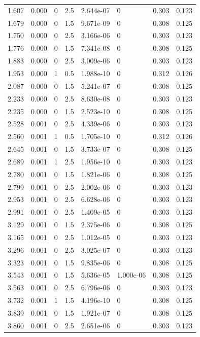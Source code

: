 \documentclass[preview]{standalone}
\begin{document}
{{\begin{tabular}{L{1.2cm}C{1.2cm} C{0.3cm}C{0.5cm} C{1.4cm}C{1.4cm} C{1.4cm}C{1.4cm}}
  1.607  &  0.000  & 0     & 2.5 &  2.644e-07  & 0  & 0.303 &  0.123   \\ 
  1.679  &  0.000  & 0     & 1.5 &  9.671e-09  & 0  & 0.308 &  0.125   \\ 
  1.750  &  0.000  & 0     & 2.5 &  3.166e-06  & 0  & 0.303 &  0.123   \\ 
  1.776  &  0.000  & 0     & 1.5 &  7.341e-08  & 0  & 0.308 &  0.125   \\ 
  1.883  &  0.000  & 0     & 2.5 &  3.009e-06  & 0  & 0.303 &  0.123   \\ 
  1.953  &  0.000  & 1     & 0.5 &  1.988e-10  & 0  & 0.312 &  0.126   \\ 
  2.087  &  0.000  & 0     & 1.5 &  5.241e-07  & 0  & 0.308 &  0.125   \\ 
  2.233  &  0.000  & 0     & 2.5 &  8.630e-08  & 0  & 0.303 &  0.123   \\ 
  2.235  &  0.000  & 0     & 1.5 &  2.523e-10  & 0  & 0.308 &  0.125   \\ 
  2.528  &  0.001  & 0     & 2.5 &  4.339e-06  & 0  & 0.303 &  0.123   \\ 
  2.560  &  0.001  & 1     & 0.5 &  1.705e-10  & 0  & 0.312 &  0.126   \\ 
  2.645  &  0.001  & 0     & 1.5 &  3.733e-07  & 0  & 0.308 &  0.125   \\ 
  2.689  &  0.001  & 1     & 2.5 &  1.956e-10  & 0  & 0.303 &  0.123   \\ 
  2.780  &  0.001  & 0     & 1.5 &  1.821e-06  & 0  & 0.308 &  0.125   \\ 
  2.799  &  0.001  & 0     & 2.5 &  2.002e-06  & 0  & 0.303 &  0.123   \\ 
  2.953  &  0.001  & 0     & 2.5 &  6.628e-06  & 0  & 0.303 &  0.123   \\ 
  2.991  &  0.001  & 0     & 2.5 &  1.409e-05  & 0  & 0.303 &  0.123   \\ 
  3.129  &  0.001  & 0     & 1.5 &  2.375e-06  & 0  & 0.308 &  0.125   \\ 
  3.165  &  0.001  & 0     & 2.5 &  1.012e-05  & 0  & 0.303 &  0.123   \\ 
  3.296  &  0.001  & 0     & 2.5 &  3.025e-07  & 0  & 0.303 &  0.123   \\ 
  3.323  &  0.001  & 0     & 1.5 &  9.835e-06  & 0  & 0.308 &  0.125   \\ 
  3.543  &  0.001  & 0     & 1.5 &  5.636e-05  & 1.000e-06  & 0.308 &  0.125   \\ 
  3.563  &  0.001  & 0     & 2.5 &  6.796e-06  & 0  & 0.303 &  0.123   \\ 
  3.732  &  0.001  & 1     & 1.5 &  4.196e-10  & 0  & 0.308 &  0.125   \\ 
  3.839  &  0.001  & 0     & 1.5 &  1.921e-07  & 0  & 0.308 &  0.125   \\ 
  3.860  &  0.001  & 0     & 2.5 &  2.651e-06  & 0  & 0.303 &  0.123   \\ 
\hline 
\end{tabular} 

}}
\end{document}
